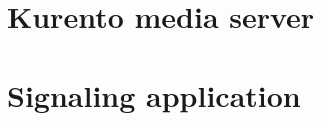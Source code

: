 \documentclass[../../thesis.tex]{subfiles}
\begin{document}


\chapter{Kurento media server}


\chapter{Signaling application}
\edef\folder{\currfolder/04_simucos}










\end{document}
